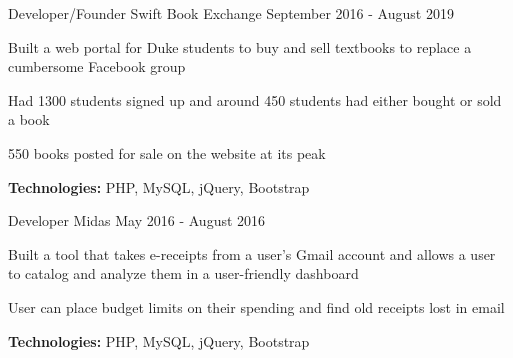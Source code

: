 
\begin{cventries}

  \cventry
    {Developer/Founder} %
    {Swift Book Exchange} %
    {} %
    {September 2016 - August 2019} %
    {
      \begin{cvitems} %
      	\item {Built a web portal for Duke students to buy and sell textbooks to replace a cumbersome Facebook group}
		\item {Had 1300 students signed up and around 450 students had either bought or sold a book}
		\item {550 books posted for sale on the website at its peak}
		{\setlength \itemindent{-2ex} \itemsep2pt \item[] \textbf{Technologies:} PHP, MySQL, jQuery, Bootstrap}
		{\setlength \itemindent{-2ex} \itemsep2pt \item[]  \href{https://sujaygarlanka.com/projects.html\#swift}{ \faPlayCircle \textbf{\color{awesome}{ Demo}}} \href{https://github.com/sujaygarlanka/swift-book-exchange}{ \faGithub \textbf{\color{awesome}{ Code}}}}
      \end{cvitems}
    }
    
 \cventry
    {Developer} %
    {Midas} %
    {} %
    {May 2016 - August 2016} %
    {
      \begin{cvitems} %
		\item {Built a tool that takes e-receipts from a user’s Gmail account and allows a user to catalog and
analyze them in a user-friendly dashboard}
        \item {User can place budget limits on their spending and find old receipts lost in email}
        {\setlength \itemindent{-2ex} \itemsep2pt \item[] \textbf{Technologies:} PHP, MySQL, jQuery, Bootstrap}
        {\setlength \itemindent{-2ex} \itemsep2pt \item[]  \href{https://sujaygarlanka.com/projects.html\#receipt}{ \faPlayCircle \textbf{\color{awesome}{ Demo}}} \href{https://github.com/sujaygarlanka/receipt-database}{ \faGithub \textbf{\color{awesome}{ Code}}}}
      \end{cvitems}
    }
\end{cventries}